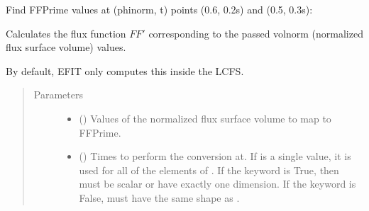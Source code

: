 \documentclass[letterpaper,10pt,english]{sphinxmanual}
\begin{document}
\begin{fulllineitems}
\begin{fulllineitems}
Find FFPrime values at (phinorm, t) points (0.6, 0.2s) and (0.5, 0.3s):

\begin{sphinxVerbatim}[commandchars=\\\{\}]
  \PYG{p}{[} \PYG{p}{]} \PYG{p}{[} \PYG{p}{]} 
\end{sphinxVerbatim}

\end{fulllineitems}


\begin{fulllineitems}
\label{\detokenize{eqtools:eqtools.core.Equilibrium.volnorm2FFPrime}}
Calculates the flux function \(FF'\) corresponding to the passed volnorm (normalized flux surface volume) values.

By default, EFIT only computes this inside the LCFS.
\begin{quote}\begin{description}
\item[{Parameters}] \leavevmode\begin{itemize}
\item {} 
 () \textendash{} Values of the normalized
flux surface volume to map to FFPrime.

\item {} 
 () \textendash{} Times to perform the conversion at.
If  is a single value, it is used for all of the elements of
. If the  keyword is True, then  must be scalar
or have exactly one dimension. If the  keyword is False,
 must have the same shape as .


\end{itemize}
\end{description}
\end{quote}
\end{fulllineitems}
\end{fulllineitems}
\end{document}
